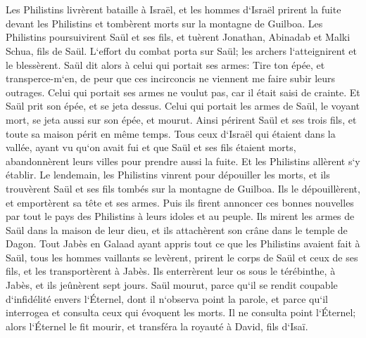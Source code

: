 \chapter{}

\verse Les Philistins livrèrent bataille à Israël, et les hommes d`Israël prirent la fuite devant les Philistins et tombèrent morts sur la montagne de Guilboa. 
\verse Les Philistins poursuivirent Saül et ses fils, et tuèrent Jonathan, Abinadab et Malki Schua, fils de Saül. 
\verse L`effort du combat porta sur Saül; les archers l`atteignirent et le blessèrent. 
\verse Saül dit alors à celui qui portait ses armes: Tire ton épée, et transperce-m`en, de peur que ces incirconcis ne viennent me faire subir leurs outrages. Celui qui portait ses armes ne voulut pas, car il était saisi de crainte. Et Saül prit son épée, et se jeta dessus. 
\verse Celui qui portait les armes de Saül, le voyant mort, se jeta aussi sur son épée, et mourut. 
\verse Ainsi périrent Saül et ses trois fils, et toute sa maison périt en même temps. 
\verse Tous ceux d`Israël qui étaient dans la vallée, ayant vu qu`on avait fui et que Saül et ses fils étaient morts, abandonnèrent leurs villes pour prendre aussi la fuite. Et les Philistins allèrent s`y établir. 
\verse Le lendemain, les Philistins vinrent pour dépouiller les morts, et ils trouvèrent Saül et ses fils tombés sur la montagne de Guilboa. 
\verse Ils le dépouillèrent, et emportèrent sa tête et ses armes. Puis ils firent annoncer ces bonnes nouvelles par tout le pays des Philistins à leurs idoles et au peuple. 
\verse Ils mirent les armes de Saül dans la maison de leur dieu, et ils attachèrent son crâne dans le temple de Dagon. 
\verse Tout Jabès en Galaad ayant appris tout ce que les Philistins avaient fait à Saül, 
\verse tous les hommes vaillants se levèrent, prirent le corps de Saül et ceux de ses fils, et les transportèrent à Jabès. Ils enterrèrent leur os sous le térébinthe, à Jabès, et ils jeûnèrent sept jours. 
\verse Saül mourut, parce qu`il se rendit coupable d`infidélité envers l`Éternel, dont il n`observa point la parole, et parce qu`il interrogea et consulta ceux qui évoquent les morts. 
\verse Il ne consulta point l`Éternel; alors l`Éternel le fit mourir, et transféra la royauté à David, fils d`Isaï. 

\chapter{}

